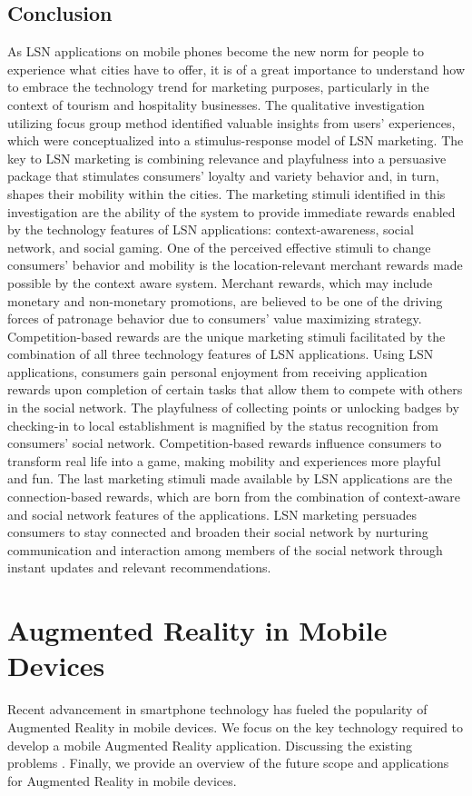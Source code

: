 \subsection{Conclusion}
As LSN applications on mobile phones become the new norm for people to experience what cities have to offer, it is of a great
importance to understand how to embrace the technology trend for marketing purposes, particularly in the context of tourism and hospitality businesses. The qualitative investigation utilizing focus group method identiﬁed valuable insights from users’ experiences, which were conceptualized into a stimulus-response model of LSN marketing. The key to LSN marketing is combining relevance and playfulness into a persuasive package that stimulates consumers’ loyalty and variety behavior and, in turn, shapes their mobility within the cities. The marketing stimuli identiﬁed in this investigation are the ability of the system to provide immediate rewards enabled by the technology features of LSN applications: context-awareness, social network, and social gaming. One of the perceived effective stimuli to change consumers’ behavior and mobility is the location-relevant merchant rewards made possible by the context aware system. Merchant rewards, which may include monetary and non-monetary promotions, are believed to be one of the driving forces of patronage behavior due to consumers’ value maximizing strategy. Competition-based rewards are the unique marketing stimuli facilitated by the combination of all three technology features of LSN applications. Using LSN applications, consumers gain personal enjoyment from receiving application rewards upon completion of certain tasks that allow them to compete with others in the social network. The playfulness of collecting points or unlocking badges by checking-in to local establishment is magniﬁed by the status recognition from consumers’ social network. Competition-based rewards inﬂuence consumers to transform real life into a game, making mobility and experiences more playful and fun. The last marketing stimuli made available by LSN applications are the connection-based rewards, which are born from the combination of context-aware and social network features of the applications. LSN marketing persuades consumers to stay connected and broaden their social network by nurturing communication and interaction among members of the social network through instant updates and relevant recommendations.
\section{Augmented Reality in Mobile Devices}
Recent advancement in smartphone technology has fueled the popularity of Augmented Reality in mobile devices. We focus on the key technology required to develop a mobile Augmented Reality application. Discussing the existing problems . Finally, we provide an overview of the future 
scope and applications for Augmented Reality in mobile devices.
